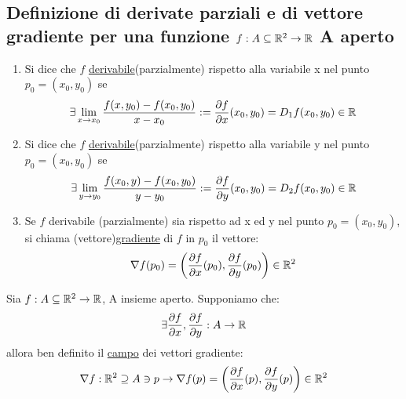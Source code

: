 \subsection{Definizione di derivate parziali e di vettore gradiente per una
funzione $f: A \subseteq \mathbb{R}^2 \to \mathbb{R}$ A aperto}
\begin{definition}
  \begin{enumerate}
    \item Si dice che $f$ \ace \underline{derivabile}(parzialmente) rispetto alla variabile x nel punto $p_0 = (x_0,y_0)$ se 
          $$\exists \lim_{x \to x_0} \frac{f(x,y_0) - f(x_0,y_0)}{x-x_0} := \frac{\partial f}{\partial x}(x_0,y_0) = D_1 f(x_0,y_0) \in \mathbb{R}$$
    \item Si dice che $f$ \ace \underline{derivabile}(parzialmente) rispetto alla variabile y nel punto $p_0 = (x_0,y_0)$ se 
          $$\exists \lim_{y \to y_0} \frac{f(x_0,y) - f(x_0,y_0)}{y-y_0} := \frac{\partial f}{\partial y}(x_0,y_0) = D_2 f(x_0,y_0) \in \mathbb{R}$$
    \item Se $f$ \ace derivabile (parzialmente) sia rispetto ad x ed y nel punto $p_0 = (x_0,y_0)$, si chiama (vettore)\underline{gradiente} di $f$ in $p_0$
          il vettore:
          $$\nabla f(p_0) = \left(\frac{\partial f}{\partial x}(p_0), \frac{\partial f}{\partial y}(p_0)\right) \in \mathbb{R}^2$$
  \end{enumerate}
  Sia $f: A \subseteq \mathbb{R}^2 \to \mathbb{R}$, A insieme aperto. Supponiamo che:
  $$\exists \frac{\partial f}{\partial x},\frac{\partial f}{\partial y} : A \to \mathbb{R}$$
  allora \ace ben definito il \underline{campo} dei vettori gradiente:
  $$\nabla f : \mathbb{R}^2 \supseteq A \ni p \to \nabla f(p) = \left(\frac{\partial f}{\partial x}(p), \frac{\partial f}{\partial y}(p)\right) \in \mathbb{R}^2$$
\end{definition}